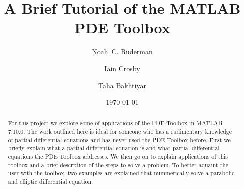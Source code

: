 \documentclass{amsart}
\theoremstyle{definition}
\begin{document}
\title{A Brief Tutorial of the MATLAB PDE Toolbox}
\date{\today} %
\author[N.\, C. Ruderman]{Noah~C. Ruderman}
\author[I.\, F. Crosby]{Iain Crosby}
\author[T.\, A. Bakhtiyar]{Taha Bakhtiyar}

\begin{abstract}
For this project we explore some of applications of the PDE Toolbox in MATLAB 7.10.0. The work outlined here is ideal for someone who has a rudimentary knowledge of partial differential equations and has never used the PDE Toolbox before. First we briefly explain what a partial differential equation is and what partial differential equations the PDE Toolbox addresses. We then go on to explain applications of this toolbox and a brief descrption of the steps to solve a problem. To better aquaint the user with the toolbox, two examples are explained that nummerically solve a parabolic and elliptic differential equation.
\end{abstract}

\maketitle
\end{document}
